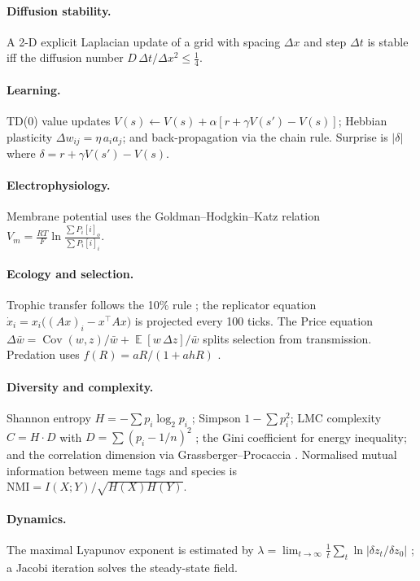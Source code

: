 \documentclass[11pt,a4paper]{article}
\DeclareMathOperator{\Cov}{Cov}
\DeclareMathOperator{\E}{\mathbb{E}}
\begin{document}
\paragraph{Diffusion stability.} A 2-D explicit Laplacian update of a grid with
spacing $\Delta x$ and step $\Delta t$ is stable iff the diffusion number
$D\,\Delta t/\Delta x^2 \le \tfrac14$.

\paragraph{Learning.} TD(0) value updates $V(s) \leftarrow V(s) + \alpha[r +
\gamma V(s') - V(s)]$; Hebbian plasticity $\Delta w_{ij} = \eta\, a_i a_j$; and
back-propagation via the chain rule. Surprise is $|\delta|$ where
$\delta = r + \gamma V(s') - V(s)$.

\paragraph{Electrophysiology.} Membrane potential uses the Goldman--Hodgkin--Katz
relation \citep{hodgkin1952,goldman1943}
$V_m = \frac{RT}{F}\ln\frac{\sum P_i [i]_o}{\sum P_i [i]_i}$.

\paragraph{Ecology and selection.} Trophic transfer follows the 10\% rule
\citep{lindeman1942}; the replicator equation
$\dot{x}_i = x_i\big((Ax)_i - x^\top A x\big)$ \citep{taylor1978} is projected
every 100 ticks. The Price equation
$\Delta\bar{w} = \Cov(w,z)/\bar{w} + \E[w\,\Delta z]/\bar{w}$ \citep{price1970}
splits selection from transmission. Predation uses
$f(R) = aR/(1+ahR)$ \citep{holling1959}.

\paragraph{Diversity and complexity.} Shannon entropy
$H = -\sum p_i \log_2 p_i$ \citep{shannon1948}; Simpson
$1-\sum p_i^2$; LMC complexity $C = H \cdot D$ with
$D = \sum (p_i - 1/n)^2$ \citep{lopezruiz1995}; the Gini coefficient for energy
inequality; and the correlation dimension via Grassberger--Procaccia
\citep{grassberger1983}. Normalised mutual information between meme tags and
species is
$\mathrm{NMI} = I(X;Y)/\sqrt{H(X)H(Y)}$.

\paragraph{Dynamics.} The maximal Lyapunov exponent is estimated by
$\lambda = \lim_{t\to\infty}\tfrac1t \sum_t \ln|\delta z_t/\delta z_0|$
\citep{lyapunov1892,strogatz2018}; a Jacobi iteration solves the steady-state
field.
\end{document}
